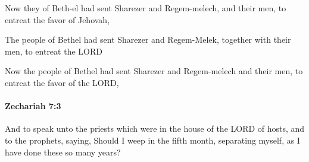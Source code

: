 			\begin{versebox}
					\item[BHS] 
					\item[LXX] 
					\item[ASV] Now they of Beth-el had sent Sharezer and Regem-melech, and their men, to entreat the favor of Jehovah,
					\item[NIV] The people of Bethel had sent Sharezer and Regem-Melek, together with their men, to entreat the LORD
					\item[NRSV] Now the people of Bethel had sent Sharezer and Regem-melech and their men, to entreat the favor of the LORD,
			\end{versebox}

		\paragraph{Zechariah 7:3} %
			\label{ZECHARIAH-7-3}

			And to speak unto the priests which were in the house of the LORD of hosts, and to the prophets, saying, Should I weep in the fifth month, separating myself, as I have done these so many years?

